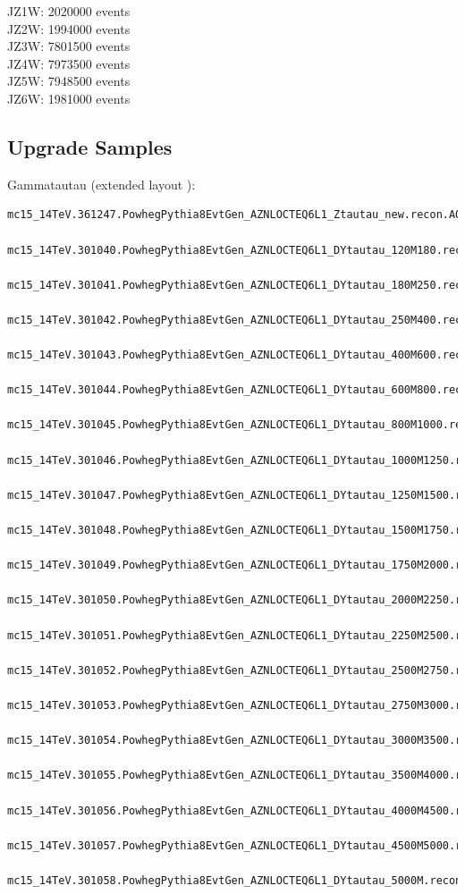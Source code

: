JZ1W: 2020000 events \\
JZ2W: 1994000 events \\
JZ3W: 7801500 events \\
JZ4W: 7973500 events \\
JZ5W: 7948500 events \\
JZ6W: 1981000 events \\

\subsection{Upgrade Samples}
\label{app:upgrade_samples}
Gammatautau (extended layout \cite{itk_layout_slides}):
\begin{lstlisting}[basicstyle=\small\ttfamily, breaklines=true]
  mc15_14TeV.361247.PowhegPythia8EvtGen_AZNLOCTEQ6L1_Ztautau_new.recon.AOD.e4805_s2987_s2999_r8820
  mc15_14TeV.301040.PowhegPythia8EvtGen_AZNLOCTEQ6L1_DYtautau_120M180.recon.AOD.e5323_s2987_s2999_r8820
  mc15_14TeV.301041.PowhegPythia8EvtGen_AZNLOCTEQ6L1_DYtautau_180M250.recon.AOD.e5323_s2987_s2999_r8820
  mc15_14TeV.301042.PowhegPythia8EvtGen_AZNLOCTEQ6L1_DYtautau_250M400.recon.AOD.e5323_s2987_s2999_r8820
  mc15_14TeV.301043.PowhegPythia8EvtGen_AZNLOCTEQ6L1_DYtautau_400M600.recon.AOD.e5323_s2987_s2999_r8820
  mc15_14TeV.301044.PowhegPythia8EvtGen_AZNLOCTEQ6L1_DYtautau_600M800.recon.AOD.e5323_s2987_s2999_r8820
  mc15_14TeV.301045.PowhegPythia8EvtGen_AZNLOCTEQ6L1_DYtautau_800M1000.recon.AOD.e5323_s2987_s2999_r8820
  mc15_14TeV.301046.PowhegPythia8EvtGen_AZNLOCTEQ6L1_DYtautau_1000M1250.recon.AOD.e5323_s2987_s2999_r8820
  mc15_14TeV.301047.PowhegPythia8EvtGen_AZNLOCTEQ6L1_DYtautau_1250M1500.recon.AOD.e5323_s2987_s2999_r8820
  mc15_14TeV.301048.PowhegPythia8EvtGen_AZNLOCTEQ6L1_DYtautau_1500M1750.recon.AOD.e5323_s2987_s2999_r8820
  mc15_14TeV.301049.PowhegPythia8EvtGen_AZNLOCTEQ6L1_DYtautau_1750M2000.recon.AOD.e5323_s2987_s2999_r8820
  mc15_14TeV.301050.PowhegPythia8EvtGen_AZNLOCTEQ6L1_DYtautau_2000M2250.recon.AOD.e5323_s2987_s2999_r8820
  mc15_14TeV.301051.PowhegPythia8EvtGen_AZNLOCTEQ6L1_DYtautau_2250M2500.recon.AOD.e5323_s2987_s2999_r8820
  mc15_14TeV.301052.PowhegPythia8EvtGen_AZNLOCTEQ6L1_DYtautau_2500M2750.recon.AOD.e5323_s2987_s2999_r8820
  mc15_14TeV.301053.PowhegPythia8EvtGen_AZNLOCTEQ6L1_DYtautau_2750M3000.recon.AOD.e5323_s2987_s2999_r8820
  mc15_14TeV.301054.PowhegPythia8EvtGen_AZNLOCTEQ6L1_DYtautau_3000M3500.recon.AOD.e5323_s2987_s2999_r8820
  mc15_14TeV.301055.PowhegPythia8EvtGen_AZNLOCTEQ6L1_DYtautau_3500M4000.recon.AOD.e5323_s2987_s2999_r8820
  mc15_14TeV.301056.PowhegPythia8EvtGen_AZNLOCTEQ6L1_DYtautau_4000M4500.recon.AOD.e5323_s2987_s2999_r8820
  mc15_14TeV.301057.PowhegPythia8EvtGen_AZNLOCTEQ6L1_DYtautau_4500M5000.recon.AOD.e5323_s2987_s2999_r8820
  mc15_14TeV.301058.PowhegPythia8EvtGen_AZNLOCTEQ6L1_DYtautau_5000M.recon.AOD.e5323_s2987_s2999_r8820
\end{lstlisting}

